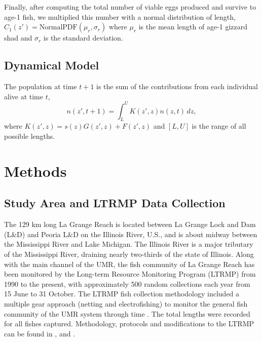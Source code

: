 \documentclass[preprint,review,12pt,authoryear]{elsarticle}
\def\ds{\displaystyle}
\begin{document}
Finally, after computing the total number of viable eggs produced and survive to age-1 fish, we multiplied this number with a normal distribution of length,
$ \ds C_1 (z') =  \mathrm{Normal PDF} (\mu_r, \sigma_r)$ where $\mu_r$ is the mean length of age-1 gizzard shad and $\sigma_r$ is the standard deviation. 

\subsection{Dynamical Model} 
The population at time $t+1$ is the sum of the contributions from each individual alive at time $t$,
\begin{equation}\label{eq:IPM}
n(z',t+1) = \int_L^U K(z',z)n(z,t) \,dz,
\end{equation}  
where $K(z',z) = s(z) G(z',z) + F(z',z)$ and $[L,U]$ is the range of all possible lengths.

\section{Methods}
\subsection{Study Area and LTRMP Data Collection}
The 129 km long La Grange Reach is located between La Grange Lock and Dam (L\&D) and Peoria L\&D on the Illinois River, U.S., and is about midway between the Mississippi River and Lake Michigan. 
The Illinois River is a major tributary of the Mississippi River, draining nearly two-thirds of the state of Illinois. 
Along with the main channel of the UMR, the fish community of La Grange Reach has been monitored by the Long-term Resource Monitoring Program (LTRMP) from 1990 to the present, with approximately 500 random collections each year from 15 June to 31 October. 
The LTRMP fish collection methodology included a multiple gear approach (netting and electrofishing) to monitor the general fish community of the UMR system through time \citep{gutreuter1995long}. 
The total lengths were recorded for all fishes captured. 
Methodology, protocols and modifications to the LTRMP can be found in \cite{gutreuter1995long}, and \cite{ickes2002evaluation}. 
\end{document}
